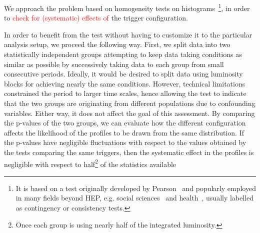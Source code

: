 We approach the problem based on homogeneity tests on histograms~\cite{homogeneity_test}\footnote{It is based on a test originally developed by Pearson~\cite{pearson1911probability} and popularly employed in many fields beyond HEP, e.g. social sciences~\cite{wickens2014multiway} and health~\cite{ma2015homogeneity}, usually labelled as contingency or consistency tests.}, in order to \textcolor{red}{check for (systematic) effects of} the trigger configuration.

In order to benefit from the test without having to customize it to the particular analysis setup, we proceed the following way. First, we split data into two
statistically independent groups attempting to keep data taking conditions as
similar as possible by successively taking data to each group from small
consecutive periods. Ideally, it would be desired to split data using luminosity
blocks for achieving nearly the same conditions. However, technical limitations
constrained the period to larger time scales, hence allowing the test to
indicate that the two groups are originating from different populations due to
confounding variables. 
Either way, it does not affect the goal of this assessment. By comparing the p-values of the two groups, we can evaluate how the different configuration affects the likelihood of the profiles to be drawn from the same distribution. If the p-values have negligible fluctuations with respect to the values obtained by the tests comparing the same triggers, then the systematic effect in the profiles is negligible with respect to half\footnote{Once each group is using nearly half of the integrated luminosity.} of the statistics available


